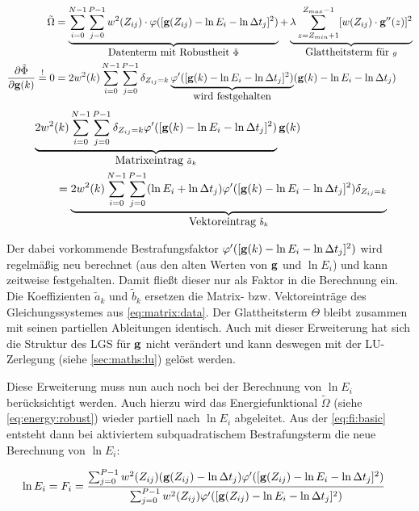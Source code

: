 \begin{align}
\label{eq:energy:robust}
\tilde{\Omega} &= 
    \underbrace{\sum_{i=0}^{N-1} \sum_{j=0}^{P-1} w^2(Z_{ij})
    \cdot \varphi([\mathbf g(Z_{ij}) - \ln E_i - \ln \Delta t_j]^2)}_{\mbox{Datenterm mit Robustheit }\tilde{\Phi}}
    + \underbrace{\lambda  \sum_{z=Z_{min}+1}^{Z_{max}-1} [w(Z_{ij}) \cdot \mathbf g''(z)]^2}_{\mbox{Glattheitsterm für }g}\\
\frac{\partial \tilde{\Phi}}{\partial \mathbf g(k)} \overset{!}{=} 0 &= 
    2 w^2(k) \sum_{i=0}^{N-1} \sum_{j=0}^{P-1}\delta_{Z_{ij}=k} 
    \underbrace{
        \varphi'(
            [\mathbf g(k)-\ln E_i - \ln \Delta t_j]^2
        )
    }_{\mbox{wird festgehalten}}
    (\mathbf g(k)-\ln E_i - \ln \Delta t_j)
\end{align}
\begin{align}
    &\underbrace{
        2w^2(k)\sum_{i=0}^{N-1} \sum_{j=0}^{P-1}  
            \delta_{Z_{ij}=k}
            \varphi'(
                [\mathbf g(k)-\ln E_i - \ln \Delta t_j]^2
            )
    }_{\mbox{Matrixeintrag } \tilde{a}_k}\mathbf g(k) \nonumber \\
    &\qquad= 
    \underbrace{
        2w^2(k)\sum_{i=0}^{N-1} \sum_{j=0}^{P-1} 
            (\ln E_i +\ln \Delta t_j)
            \varphi'(
                [\mathbf g(k)-\ln E_i - \ln \Delta t_j]^2
            )
            \delta_{Z_{ij}=k}
    }_{\mbox{Vektoreintrag }\tilde{b}_k}
\end{align}

Der dabei vorkommende Bestrafungsfaktor $\varphi'([\mathbf g(k)-\ln E_i - \ln \Delta t_j]^2)$ wird regelmäßig neu berechnet  (aus den alten Werten von $\mathbf g$ und $\ln E_i$) und kann zeitweise festgehalten. Damit fließt dieser nur als Faktor in die Berechnung ein. Die Koeffizienten $\tilde a_k$ und $\tilde b_k$ ersetzen die Matrix- bzw. Vektoreinträge des Gleichungssystemes aus \autoref{eq:matrix:data}. Der Glattheitsterm $\Theta$ bleibt zusammen mit seinen partiellen Ableitungen identisch. Auch mit dieser Erweiterung hat sich die Struktur des LGS für $\mathbf g$ nicht verändert und kann deswegen mit der LU-Zerlegung (siehe \autoref{sec:maths:lu}) gelöst werden. 


Diese Erweiterung muss nun auch noch bei der Berechnung von $\ln E_i$ berücksichtigt werden. Auch hierzu wird das Energiefunktional $\tilde{\Omega}$ (siehe \autoref{eq:energy:robust}) wieder partiell nach $\ln E_i$ abgeleitet. Aus der \autoref{eq:fi:basic} entsteht dann bei aktiviertem subquadratischem Bestrafungsterm die neue Berechnung von $\ln E_i$:

\begin{align}
    \label{eq:f_i:robust}
    \ln E_i = F_i &= \frac{
        \sum_{j=0}^{P-1} 
            w^2(Z_{ij})
            (\mathbf g(Z_{ij})-\ln \Delta t_j)
            \varphi'(
                [\mathbf g(Z_{ij})-\ln E_i - \ln \Delta t_j]^2
            )
    }
    {
        \sum_{j=0}^{P-1} 
            w^2(Z_{ij})
            \varphi'(
                [\mathbf g(Z_{ij})-\ln E_i - \ln \Delta t_j]^2
            )
    }
\end{align}


